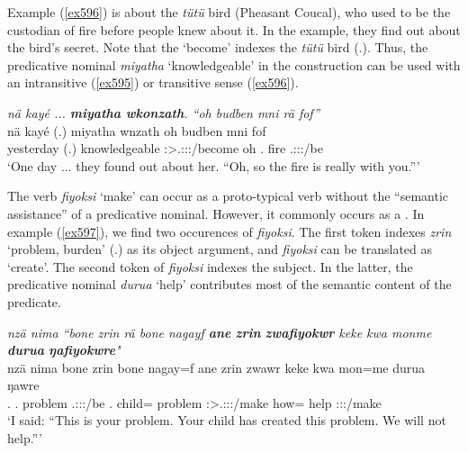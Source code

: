 Example (\ref{ex596}) is about the \emph{tütü} bird (Pheasant Coucal), who used to be the custodian of fire before people knew about it. In the example, they find out about the bird's secret. Note that the  `become' indexes the \emph{tütü} bird (\Tsg.\F). Thus, the predicative nominal \emph{miyatha} `knowledgeable' in the  construction can be used with an intransitive (\ref{ex595}) or transitive sense (\ref{ex596}).

\begin{exe}
	\ex \emph{nä kayé ... \textbf{miyatha wkonzath}. ``oh budben mni rä fof''}\\
	\gll nä kayé (.) miyatha wnzath oh budben mni  fof\\
	\Indf{} yesterday (.) knowledgeable \Stpl:\Sbj>\Tsg.\F:\Obj:\Pst:\Ipfv/become oh \Ssg.\Loc{} fire \Tsg.\F:\Sbj:\Nonpast:\Ipfv/be \Emph{}\\
	\trans `One day ... they found out about her. ``Oh, so the fire is really with you.'''\\
	\label{ex596}
\end{exe}

The verb \emph{fiyoksi} `make' can occur as a proto-typical  verb without the ``semantic assistance'' of a predicative nominal. However, it commonly occurs as a . In example (\ref{ex597}), we find two occurences of \emph{fiyoksi}. The first token indexes \emph{zrin} `problem, burden' (\Tsg.\F) as its object argument, and \emph{fiyoksi} can be translated as `create'. The second token of \emph{fiyoksi} indexes the subject. In the latter, the predicative nominal \emph{durua} `help' contributes most of the semantic content of the predicate.

\begin{exe}
	\ex \emph{nzä nima ``bone zrin rä bone nagayf \textbf{ane} \textbf{zrin} \textbf{zwafiyokwr} keke kwa monme \textbf{durua} \textbf{ŋafiyokwre}"}\\
	\gll nzä nima bone zrin  bone nagay=f ane zrin zwawr keke kwa mon=me durua ŋawre\\
	\Fsg.\Abs{} \Quot{} \Ssg.\Poss{} problem \Tsg.\F:\Sbj:\Nonpast:\Ipfv/be \Ssg.\Poss{} child=\Erg{} \Dem{} problem \Stsg:\Sbj>\Tsg.\F:\Obj:\Rpst:\Ipfv/make \Neg{} \Fut{} how=\Ins{} help \Fpl:\Sbj:\Nonpast:\Ipfv/make\\
	\trans `I said: ``This is your problem. Your child has created this problem. We will not help.'''
	\label{ex597}
\end{exe}

